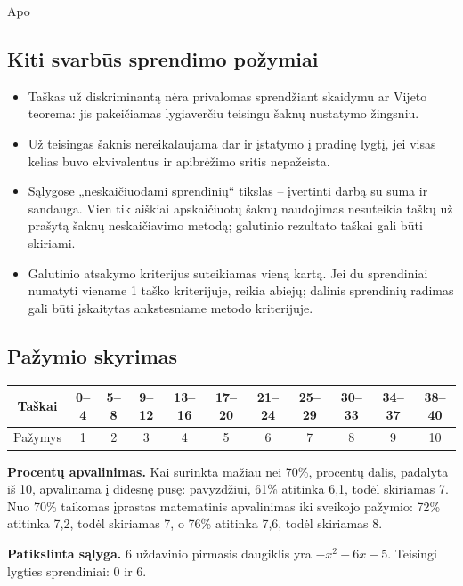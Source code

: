 Apo\documentclass[11pt,a4paper]{article}
\begin{document}
\subsection*{Kiti svarbūs sprendimo požymiai}
\begin{itemize}
\item Taškas už diskriminantą nėra privalomas sprendžiant skaidymu ar Vijeto teorema: jis pakeičiamas lygiaverčiu teisingu šaknų nustatymo žingsniu.
\item Už teisingas šaknis nereikalaujama dar ir įstatymo į pradinę lygtį, jei visas kelias buvo ekvivalentus ir apibrėžimo sritis nepažeista.
\item Sąlygose „neskaičiuodami sprendinių“ tikslas -- įvertinti darbą su suma ir sandauga. Vien tik aiškiai apskaičiuotų šaknų naudojimas nesuteikia taškų už prašytą šaknų neskaičiavimo metodą; galutinio rezultato taškai gali būti skiriami.
\item Galutinio atsakymo kriterijus suteikiamas vieną kartą. Jei du sprendiniai numatyti viename 1 taško kriterijuje, reikia abiejų; dalinis sprendinių radimas gali būti įskaitytas ankstesniame metodo kriterijuje.
\end{itemize}

\subsection*{Pažymio skyrimas}
\begin{center}\small
\begin{tabular}{|c|*{10}{c|}}\hline
Taškai&0--4&5--8&9--12&13--16&17--20&21--24&25--29&30--33&34--37&38--40\\\hline
Pažymys&1&2&3&4&5&6&7&8&9&10\\\hline
\end{tabular}\end{center}

\textbf{Procentų apvalinimas.} Kai surinkta mažiau nei 70\%, procentų dalis, padalyta iš 10, apvalinama į didesnę pusę: pavyzdžiui, 61\% atitinka 6,1, todėl skiriamas 7. Nuo 70\% taikomas įprastas matematinis apvalinimas iki sveikojo pažymio: 72\% atitinka 7,2, todėl skiriamas 7, o 76\% atitinka 7,6, todėl skiriamas 8.

\textbf{Patikslinta sąlyga.} 6 uždavinio pirmasis daugiklis yra $-x^2+6x-5$. Teisingi lygties sprendiniai: $0$ ir $6$.
\newpage
\end{document}

